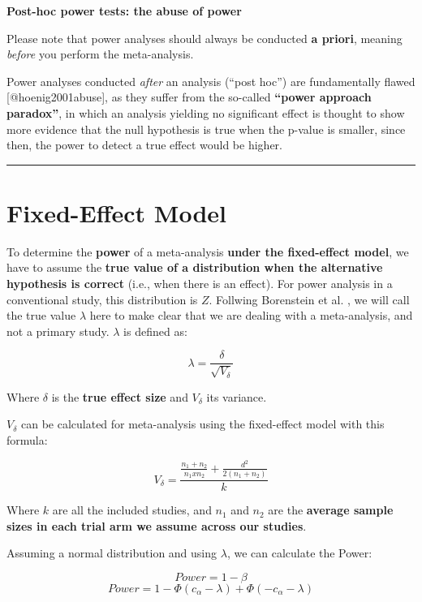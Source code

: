\documentclass[]{book}
\begin{document}
\begin{rmdachtung}
\textbf{Post-hoc power tests: the abuse of power}

Please note that power analyses should always be conducted \textbf{a
priori}, meaning \emph{before} you perform the meta-analysis.

Power analyses conducted \emph{after} an analysis (``post hoc'') are
fundamentally flawed {[}@hoenig2001abuse{]}, as they suffer from the
so-called \textbf{``power approach paradox''}, in which an analysis
yielding no significant effect is thought to show more evidence that the
null hypothesis is true when the p-value is smaller, since then, the
power to detect a true effect would be higher.
\end{rmdachtung}

\begin{center}\rule{0.5\linewidth}{\linethickness}\end{center}

\hypertarget{fixed.power}{%
\section{Fixed-Effect Model}\label{fixed.power}}

To determine the \textbf{power} of a meta-analysis \textbf{under the fixed-effect model}, we have to assume the \textbf{true value of a distribution when the alternative hypothesis is correct} (i.e., when there is an effect). For power analysis in a conventional study, this distribution is \(Z\). Follwing Borenstein et al. \citep{borenstein2011}, we will call the true value \(\lambda\) here to make clear that we are dealing with a meta-analysis, and not a primary study. \(\lambda\) is defined as:

\[\lambda=\frac{\delta}{\sqrt{V_{\delta}}}\]

Where \(\delta\) is the \textbf{true effect size} and \(V_{\delta}\) its variance.

\(V_{\delta}\) can be calculated for meta-analysis using the fixed-effect model with this formula:

\[V_{\delta}=\frac{\frac{n_1+n_2}{n_1xn_2}+\frac{d^2}{2(n_1+n_2)}}{k}\]

Where \(k\) are all the included studies, and \(n_1\) and \(n_2\) are the \textbf{average sample sizes in each trial arm we assume across our studies}.

Assuming a normal distribution and using \(\lambda\), we can calculate the Power:

\[Power = 1- \beta\]
\[Power = 1- \Phi(c_{\alpha}-\lambda)+\Phi(-c_{\alpha}-\lambda) \]
\end{document}
